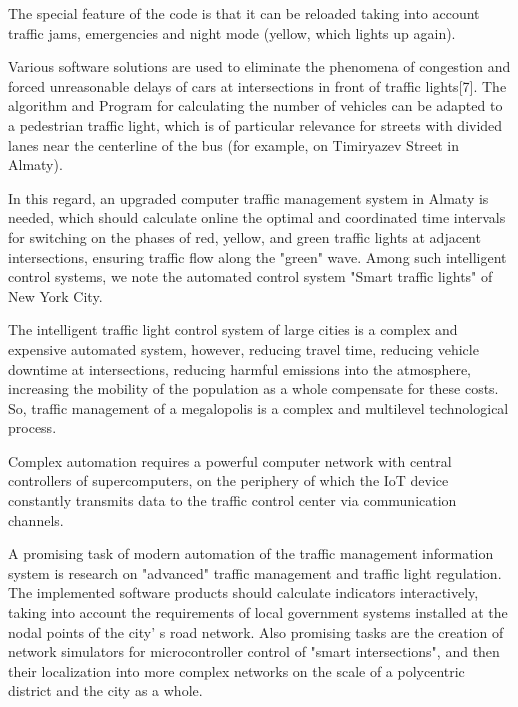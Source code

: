 \begin{multicols}{2}
The special feature of the code is that it can be reloaded taking into
account traffic jams, emergencies and night mode (yellow, which lights
up again).

Various software solutions are used to eliminate the phenomena of
congestion and forced unreasonable delays of cars at intersections in
front of traffic lights{[}7{]}. The algorithm and Program for
calculating the number of vehicles can be adapted to a pedestrian
traffic light, which is of particular relevance for streets with divided
lanes near the centerline of the bus (for example, on Timiryazev Street
in Almaty).

In this regard, an upgraded computer traffic management system in Almaty
is needed, which should calculate online the optimal and coordinated
time intervals for switching on the phases of red, yellow, and green
traffic lights at adjacent intersections, ensuring traffic flow along
the "green" wave. Among such intelligent control systems, we note the
automated control system "Smart traffic lights" of New York City.

The intelligent traffic light control system of large cities is a
complex and expensive automated system, however, reducing travel time,
reducing vehicle downtime at intersections, reducing harmful emissions
into the atmosphere, increasing the mobility of the population as a
whole compensate for these costs. So, traffic management of a
megalopolis is a complex and multilevel technological process.

Complex automation requires a powerful computer network with central
controllers of supercomputers, on the periphery of which the IoT device
constantly transmits data to the traffic control center via
communication channels.

A promising task of modern automation of the traffic management
information system is research on "advanced" traffic management and
traffic light regulation. The implemented software products should
calculate indicators interactively, taking into account the requirements
of local government systems installed at the nodal points of the
city' s road network. Also promising tasks are the
creation of network simulators for microcontroller control of "smart
intersections", and then their localization into more complex networks
on the scale of a polycentric district and the city as a whole.
\end{multicols}

